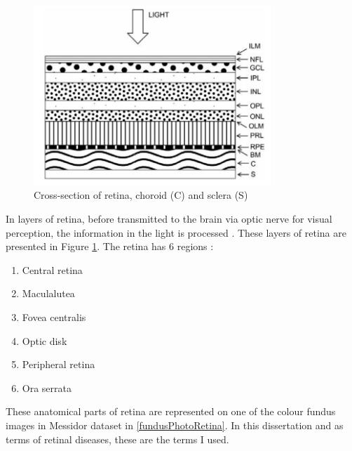 \begin{figure}[t]
\caption{Cross-section of retina, choroid (C) and sclera (S) \citep{falt2012modern}}
\label{layersOfRetina}
\centering
\includegraphics[width=0.8\textwidth]{Figures/layers_of_retina}
\end{figure}


In layers of retina, before transmitted to the brain via optic nerve for visual perception, the information in the light is processed \citep{kauppi2010eye}. These layers of retina are presented in Figure \ref{layersOfRetina}. The retina has 6 regions \citep{forrester2015eye}:

\begin{enumerate}
    \item Central retina
    \item Maculalutea
    \item Fovea centralis
    \item Optic disk
    \item Peripheral retina
    \item Ora serrata
\end{enumerate}

These anatomical parts of retina are represented on one of the colour fundus images in Messidor dataset \citep{mookiah2015application} in \ref{fundusPhotoRetina}. In this dissertation and as terms of retinal diseases, these are the terms I used. 

